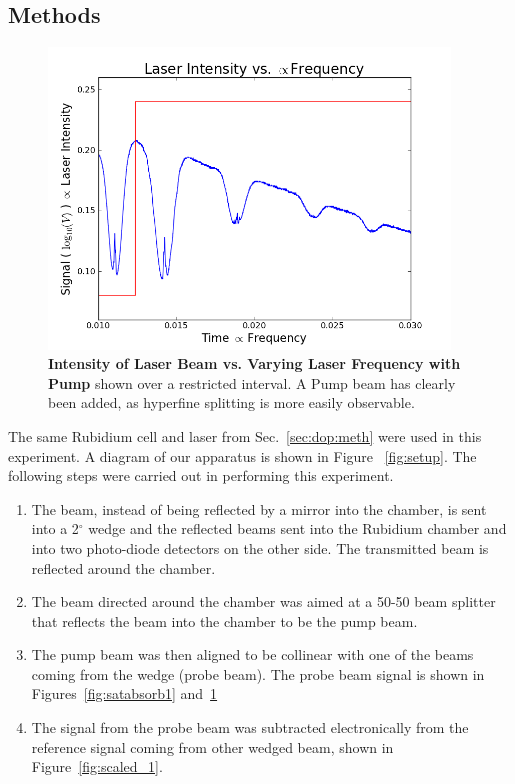 \documentclass[paper=a4, fontsize=11pt]{scrartcl} %
\numberwithin{equation}{section}
\numberwithin{figure}{section}
\numberwithin{table}{section}
\begin{document}
\subsection{Methods}
\label{sec:satabmeth}
\begin{figure}[h] \begin{center}
  \includegraphics[height=80mm]{2-2-002-zoom.png}
  \caption{\textbf{Intensity of Laser Beam vs. Varying Laser Frequency with Pump} shown over a restricted interval. A Pump beam has clearly been added, as hyperfine splitting is more easily observable. }
  \label{fig:withPump_1}
\end{center} \end{figure}
The same Rubidium cell and laser from Sec.~\ref{sec:dop:meth} were
used in this experiment. A diagram of our apparatus is shown in Figure
~\ref{fig:setup}. The following steps were carried out in performing
this experiment. 
\begin{enumerate}
\item The beam, instead of being reflected by a mirror into the
  chamber, is sent into a 2$^\circ$ wedge and the reflected beams sent
  into the Rubidium chamber and into two photo-diode detectors on the
  other side. The transmitted beam is reflected around
  the chamber.
\item The beam directed around the chamber was aimed at a 50-50 beam
  splitter that reflects the beam into the chamber to be the pump beam.
\item The pump beam was then aligned to be collinear with one of the
  beams coming from the wedge (probe beam). The probe beam signal is
  shown in Figures~\ref{fig:satabsorb1} and~\ref{fig:withPump_1}
\item The signal from the probe beam was subtracted electronically
  from the reference signal coming from other wedged beam, shown in Figure~\ref{fig:scaled_1}. 
\end{enumerate}
\end{document}
